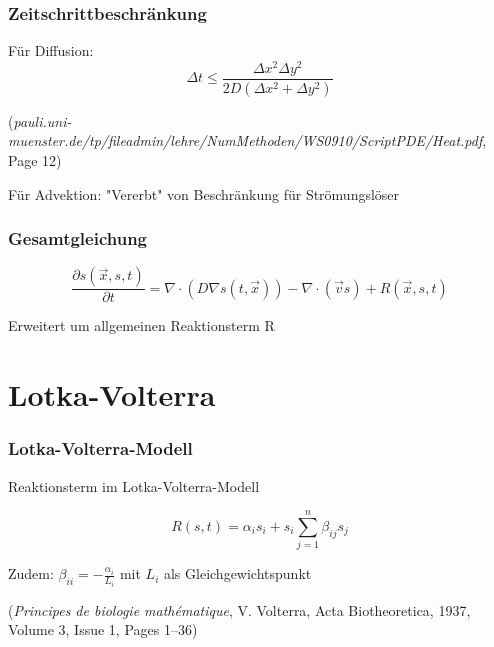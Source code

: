 \documentclass[12pt]{beamer}
\begin{document}
    \begin{frame}
      \frametitle{Zeitschrittbeschränkung}
      Für Diffusion:
      $$\Delta t \leq \frac{\Delta x^2 \Delta y^2}{2D(\Delta x^2 + \Delta y^2)}$$
      
      \hfill
      
      {\tiny (\emph{pauli.uni-muenster.de/tp/fileadmin/lehre/NumMethoden/WS0910/ScriptPDE/Heat.pdf},
	  \\[-0.15cm]
      Page 12)}
      
      \hfill
      
      Für Advektion: "Vererbt" von Beschränkung für Strömungslöser
    \end{frame}

  \begin{frame}
    \frametitle{Gesamtgleichung}
    $$\frac{\partial s(\vec{x},s,t)}{\partial t} = \nabla \cdot (D \nabla s(t,\vec{x})) - \nabla \cdot (\vec{v}s) + R(\vec{x},s,t)$$
    
    Erweitert um allgemeinen Reaktionsterm R
  \end{frame}

  \section{Lotka-Volterra}
    \begin{frame}
    \frametitle{Lotka-Volterra-Modell}
    Reaktionsterm im Lotka-Volterra-Modell
    
    $$R(s,t) = \alpha_i s_i + s_i \sum_{j=1}^{n} \beta_{ij} s_j$$
    
    Zudem: $\beta_{ii} = -\frac{\alpha_i}{L_i}$ mit $L_i$ als Gleichgewichtspunkt
    
	\hfill    
    
    \begin{center}
    {\tiny (\emph{Principes de biologie mathématique}, V. Volterra, Acta Biotheoretica, 1937,
	\\[-0.15cm]    
    Volume 3, Issue 1, Pages 1–36)}
    \end{center}
    \end{frame}
    
\end{document}
